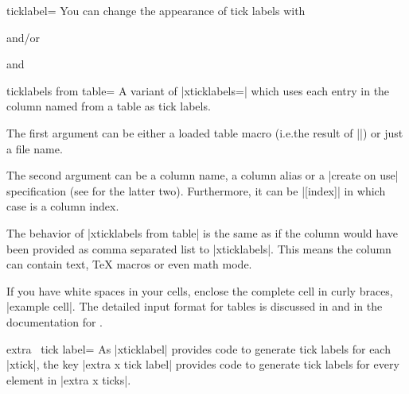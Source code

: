 \begin{pgfplotsxykey}{\x ticklabel=}
    You can change the appearance of tick labels with
\begin{codeexample}
\end{codeexample}
    and/or
\begin{codeexample}
\end{codeexample}
    and
\begin{codeexample}
\end{codeexample}
\end{pgfplotsxykey}

\begin{pgfplotsxykey}{\x ticklabels from table=}
    A variant of |xticklabels=| which uses each entry in the column
    named  from a table as tick labels.

    The first argument  can be either a
    loaded table macro (i.e.\@ the result of |\pgfplotstableread|) or just a file name.

    The second argument can be a column name, a column alias or a
    |create on use| specification (see \PGFPlotstable{} for the latter two).
    Furthermore, it can be |[index]| in which case 
    is a column index.

    The behavior of |xticklabels from table| is the same as if the column
     would have been provided as comma separated list to
    |xticklabels|. This means the column can contain text, \TeX{} macros or
    even math mode.

    If you have white spaces in your cells, enclose the complete cell in curly
    braces, |{example cell}|. The detailed input format for tables is discussed
    in  and in the documentation for
    \PGFPlotstable{}.
\end{pgfplotsxykey}

\begin{pgfplotsxykey}{extra \x\ tick label=}
    As |xticklabel| provides code to generate tick labels for each |xtick|, the
    key |extra x tick label| provides code to generate tick labels for every
    element in |extra x ticks|.
\end{pgfplotsxykey}

